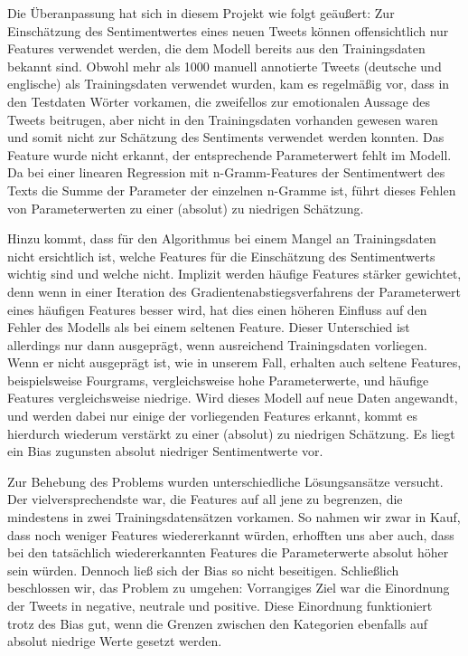 Die Überanpassung hat sich in diesem Projekt wie folgt geäußert: Zur Einschätzung des Sentimentwertes eines neuen Tweets können offensichtlich nur Features verwendet werden, die dem Modell bereits aus den Trainingsdaten bekannt sind. Obwohl mehr als 1000 manuell annotierte Tweets (deutsche und englische) als Trainingsdaten verwendet wurden, kam es regelmäßig vor, dass in den Testdaten Wörter vorkamen, die zweifellos zur emotionalen Aussage des Tweets beitrugen, aber nicht in den Trainingsdaten vorhanden gewesen waren und somit nicht zur Schätzung des Sentiments verwendet werden konnten. Das Feature wurde nicht erkannt, der entsprechende Parameterwert fehlt im Modell. Da bei einer linearen Regression mit n-Gramm-Features der Sentimentwert des Texts die Summe der Parameter der einzelnen n-Gramme ist, führt dieses Fehlen von Parameterwerten zu einer (absolut) zu niedrigen Schätzung.

Hinzu kommt, dass für den Algorithmus bei einem Mangel an Trainingsdaten nicht ersichtlich ist, welche Features für die Einschätzung des Sentimentwerts wichtig sind und welche nicht. Implizit werden häufige Features stärker gewichtet, denn wenn in einer Iteration des Gradientenabstiegsverfahrens der Parameterwert eines häufigen Features besser wird, hat dies einen höheren Einfluss auf den Fehler des Modells als bei einem seltenen Feature. Dieser Unterschied ist allerdings nur dann ausgeprägt, wenn ausreichend Trainingsdaten vorliegen. Wenn er nicht ausgeprägt ist, wie in unserem Fall, erhalten auch seltene Features, beispielsweise Fourgrams, vergleichsweise hohe Parameterwerte, und häufige Features vergleichsweise niedrige. Wird dieses Modell auf neue Daten angewandt, und werden dabei nur einige der vorliegenden Features erkannt, kommt es hierdurch wiederum verstärkt zu einer (absolut) zu niedrigen Schätzung. Es liegt ein Bias zugunsten absolut niedriger Sentimentwerte vor.

Zur Behebung des Problems wurden unterschiedliche Lösungsansätze versucht. Der vielversprechendste war, die Features auf all jene zu begrenzen, die mindestens in zwei Trainingsdatensätzen vorkamen. So nahmen wir zwar in Kauf, dass noch weniger Features wiedererkannt würden, erhofften uns aber auch, dass bei den tatsächlich wiedererkannten Features die Parameterwerte absolut höher sein würden. Dennoch ließ sich der Bias so nicht beseitigen.
Schließlich beschlossen wir, das Problem zu umgehen: Vorrangiges Ziel war die Einordnung der Tweets in negative, neutrale und positive. Diese Einordnung funktioniert trotz des Bias gut, wenn die Grenzen zwischen den Kategorien ebenfalls auf absolut niedrige Werte gesetzt werden.

